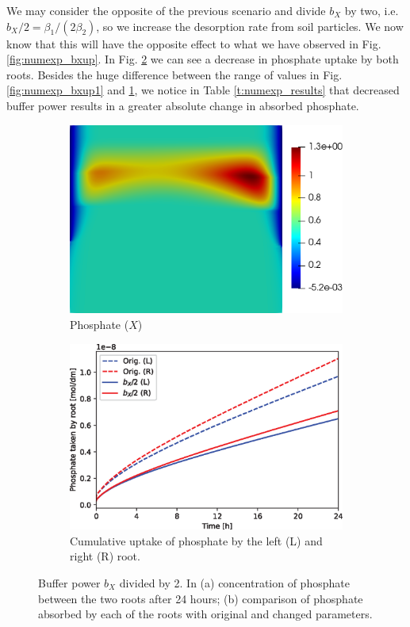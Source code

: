 \documentclass[11pt]{article}
\numberwithin{equation}{section}
\begin{document}
We may consider the opposite of the previous scenario and divide $b_X$ by two, i.e. $b_X / 2 = \beta_1 / (2 \beta_2)$, so we increase the desorption rate from soil particles. We now know that this will have the opposite effect to what we have observed in Fig. \ref{fig:numexp_bxup}. In Fig. \ref{fig:numexp_bxdown2} we can see a decrease in phosphate uptake by both roots. Besides the huge difference between the range of values in Fig. \ref{fig:numexp_bxup1} and \ref{fig:numexp_bxdown1}, we notice in Table \ref{t:numexp_results} that decreased buffer power results in a greater absolute change in absorbed phosphate.

\begin{figure}[!htb]
\centering
\begin{subfigure}[t]{0.35\textwidth}
    \includegraphics[width=\textwidth]{Figures/X_bXdivby2.png}
    \caption{Phosphate ($X$)}
    \label{fig:numexp_bxdown1}
\end{subfigure}
\hspace{1cm}
\begin{subfigure}[t]{0.45\textwidth}
    \includegraphics[width=\textwidth]{Figures/bxdivby2.eps}
    \caption{Cumulative uptake of phosphate by the left (L) and right (R) root.}
    \label{fig:numexp_bxdown2}
\end{subfigure}
\caption{Buffer power $b_X$ divided by 2. In (a) concentration of phosphate between the two roots after 24 hours; (b) comparison of phosphate absorbed by each of the roots with original and changed parameters.}
\label{fig:numexp_bxdown}
\end{figure}
\end{document}
